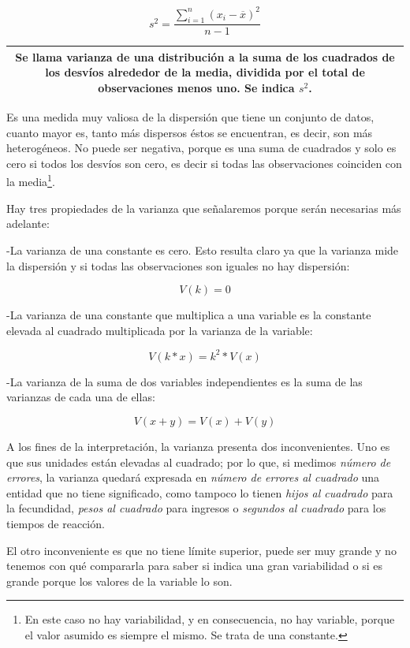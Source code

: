 \documentclass[]{book}
\let\rmarkdownfootnote\footnote%
\def\footnote{\protect\rmarkdownfootnote}
\begin{document}
\[s^{2} = \frac{\sum_{i = 1}^{n}\left( x_{i} - \overline{x} \right)^{2}}{n - 1}\]

\begin{longtable}[]{@{}c@{}}
\toprule
\endhead
\begin{minipage}[t]{0.97\columnwidth}\centering
Se llama \textbf{varianza} de una distribución a la suma de los cuadrados de los desvíos alrededor de la media, dividida por el total de observaciones menos uno. Se indica \(s^2\).\strut
\end{minipage}\tabularnewline
\bottomrule
\end{longtable}

Es una medida muy valiosa de la dispersión que tiene un conjunto de
datos, cuanto mayor es, tanto más dispersos éstos se encuentran, es
decir, son más heterogéneos. No puede ser negativa, porque es una suma de cuadrados y solo es cero si todos los desvíos son cero, es decir si todas las observaciones coinciden con la media\footnote{En este caso no hay variabilidad, y en consecuencia, no hay variable, porque el valor asumido es siempre el mismo. Se trata de una constante.}.

Hay tres propiedades de la varianza que señalaremos porque serán
necesarias más adelante:

-La varianza de una constante es cero. Esto resulta claro ya que la
varianza mide la dispersión y si todas las observaciones son iguales no hay dispersión:

\[V\left( k \right) = 0\]

-La varianza de una constante que multiplica a una variable es la
constante elevada al cuadrado multiplicada por la varianza de la
variable:

\[V\left( k*x \right) = k^{2}*V(x)\]

-La varianza de la suma de dos variables independientes es la suma de
las varianzas de cada una de ellas:

\[V\left( x + y \right) = V\left( x \right) + V(y)\]

A los fines de la interpretación, la varianza presenta dos
inconvenientes. Uno es que sus unidades están elevadas al cuadrado; por lo que, si medimos \emph{número de errores}, la varianza quedará expresada en \emph{número de errores al cuadrado} una entidad que no tiene significado, como tampoco lo tienen \emph{hijos al cuadrado} para la fecundidad, \emph{pesos al cuadrado} para ingresos o \emph{segundos al cuadrado} para los tiempos de reacción.

El otro inconveniente es que no tiene límite superior, puede ser muy
grande y no tenemos con qué compararla para saber si indica una gran
variabilidad o si es grande porque los valores de la variable lo son.
\end{document}
